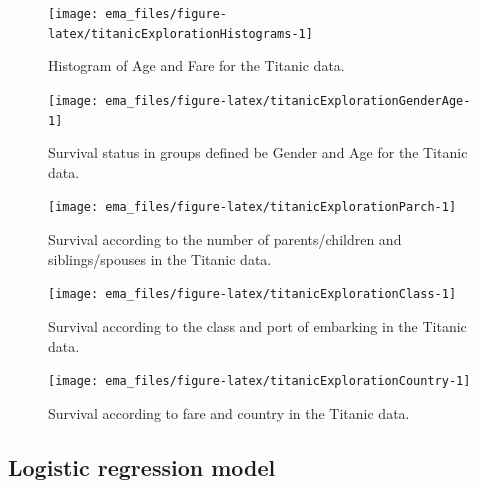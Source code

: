\documentclass[]{krantz}
\begin{document}
\begin{figure}

{\centering \texttt{[image: ema\_files/figure-latex/titanicExplorationHistograms-1]} 

}

\caption{Histogram of Age and Fare for the Titanic data.}\label{fig:titanicExplorationHistograms}
\end{figure}

\begin{figure}

{\centering \texttt{[image: ema\_files/figure-latex/titanicExplorationGenderAge-1]} 

}

\caption{Survival status in groups defined be Gender and Age for the Titanic data.}\label{fig:titanicExplorationGenderAge}
\end{figure}

\begin{figure}

{\centering \texttt{[image: ema\_files/figure-latex/titanicExplorationParch-1]} 

}

\caption{Survival according to the number of parents/children and siblings/spouses in the Titanic data.}\label{fig:titanicExplorationParch}
\end{figure}

\begin{figure}

{\centering \texttt{[image: ema\_files/figure-latex/titanicExplorationClass-1]} 

}

\caption{Survival according to the class and port of embarking in the Titanic data.}\label{fig:titanicExplorationClass}
\end{figure}

\begin{figure}

{\centering \texttt{[image: ema\_files/figure-latex/titanicExplorationCountry-1]} 

}

\caption{Survival according to fare and country in the Titanic data.}\label{fig:titanicExplorationCountry}
\end{figure}

\hypertarget{model-titanic-lmr}{%
\subsection{Logistic regression model}\label{model-titanic-lmr}}
\end{document}
